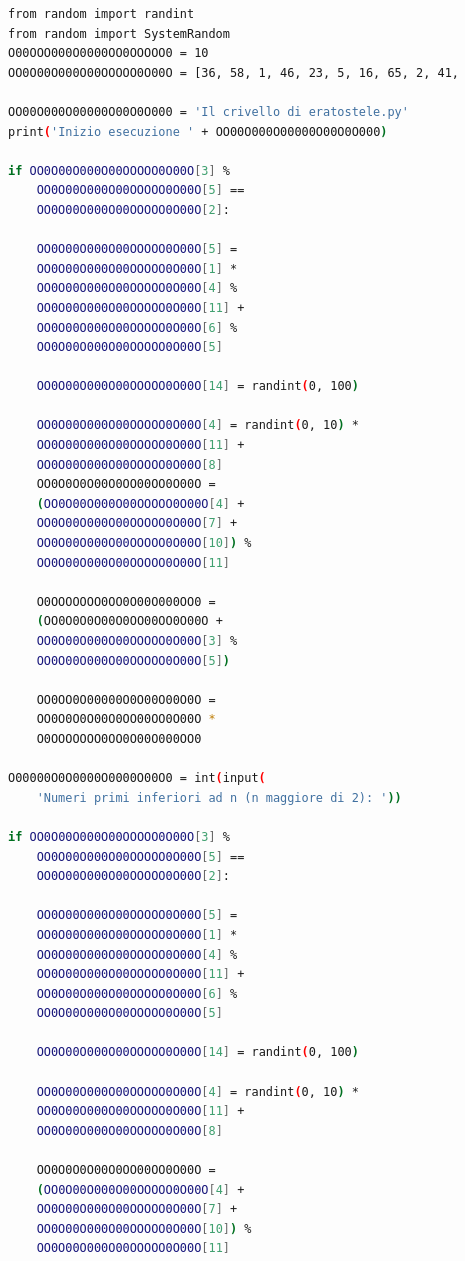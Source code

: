 \documentclass[a4paper,oneside,openright,titlepage,10pt,footinclude,headinclude]{scrbook}
\begin{document}
\begin{graybox}
\begin{lstlisting}[language=bash,basicstyle=\fontsize{10}{9}\selectfont,]
from random import randint
from random import SystemRandom
O00OOO000O0000OO0OOOOO0 = 10
OO0O00O000O00OOOOO0O00O = [36, 58, 1, 46, 23, 5, 16, 65, 2, 41, 
																		2, 7, 1, 37, 0, 11, 16, 2, 21, 16]
OO00O000O00000O00O0O000 = 'Il crivello di eratostele.py'
print('Inizio esecuzione ' + OO00O000O00000O00O0O000)

if OO0O00O000O00OOOOO0O00O[3] % 
	OO0O00O000O00OOOOO0O00O[5] == 
	OO0O00O000O00OOOOO0O00O[2]:
    
    OO0O00O000O00OOOOO0O00O[5] = 
    OO0O00O000O00OOOOO0O00O[1] * 
    OO0O00O000O00OOOOO0O00O[4] % 
    OO0O00O000O00OOOOO0O00O[11] + 
    OO0O00O000O00OOOOO0O00O[6] % 
    OO0O00O000O00OOOOO0O00O[5]
    
    OO0O00O000O00OOOOO0O00O[14] = randint(0, 100)
    
    OO0O00O000O00OOOOO0O00O[4] = randint(0, 10) * 
    OO0O00O000O00OOOOO0O00O[11] + 
    OO0O00O000O00OOOOO0O00O[8]
    OO0O0O0O00O0OO00OO0O00O = 
    (OO0O00O000O00OOOOO0O00O[4] +
    OO0O00O000O00OOOOO0O00O[7] + 
    OO0O00O000O00OOOOO0O00O[10]) % 
    OO0O00O000O00OOOOO0O00O[11]
    
    O0OOOOOOO0OO0O00O000OO0 = 
    (OO0O0O0O00O0OO00OO0O00O + 
    OO0O00O000O00OOOOO0O00O[3] % 
    OO0O00O000O00OOOOO0O00O[5])
    
    OO0OO0O00000O0O00O00O0O = 
    OO0O0O0O00O0OO00OO0O00O * 
    O0OOOOOOO0OO0O00O000OO0
    
O00000O0O0000O0000O00O0 = int(input(
    'Numeri primi inferiori ad n (n maggiore di 2): '))
    
if OO0O00O000O00OOOOO0O00O[3] % 
	OO0O00O000O00OOOOO0O00O[5] == 
	OO0O00O000O00OOOOO0O00O[2]:
	
    OO0O00O000O00OOOOO0O00O[5] = 
    OO0O00O000O00OOOOO0O00O[1] * 
    OO0O00O000O00OOOOO0O00O[4] % 
    OO0O00O000O00OOOOO0O00O[11] + 
    OO0O00O000O00OOOOO0O00O[6] % 
    OO0O00O000O00OOOOO0O00O[5]
    
    OO0O00O000O00OOOOO0O00O[14] = randint(0, 100)
    
    OO0O00O000O00OOOOO0O00O[4] = randint(0, 10) * 
    OO0O00O000O00OOOOO0O00O[11] + 
    OO0O00O000O00OOOOO0O00O[8]
    
    OO0O0O0O00O0OO00OO0O00O = 
    (OO0O00O000O00OOOOO0O00O[4] +
    OO0O00O000O00OOOOO0O00O[7] + 
    OO0O00O000O00OOOOO0O00O[10]) % 
    OO0O00O000O00OOOOO0O00O[11]
    

\end{lstlisting}
\end{graybox}
\end{document}
